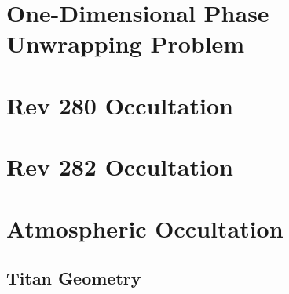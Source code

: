 \documentclass{article}
\theoremstyle{mystyle}
\begin{document}
\section{One-Dimensional Phase Unwrapping Problem}
\section{Rev 280 Occultation}
\section{Rev 282 Occultation}
\section{Atmospheric Occultation}
\subsection{Titan Geometry}
\end{document}
